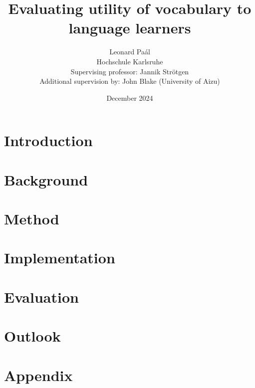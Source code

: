 \documentclass[12pt]{report}
\title{Evaluating utility of vocabulary to language learners}
\author{Leonard Paál\\Hochschule Karlsruhe\\Supervising professor: Jannik Strötgen\\Additional supervision by: John Blake (University of Aizu)}
\date{December 2024}
\begin{document}
\maketitle
\begin{abstract}
	\noindent [Abstract]
\end{abstract}

\clearpage
\tableofcontents
\listoffigures
\listoftables
\clearpage

\chapter{Introduction}

\chapter{Background}

\chapter{Method}

\chapter{Implementation}

\chapter{Evaluation}

\chapter{Outlook}


\chapter{Appendix}




\end{document}
